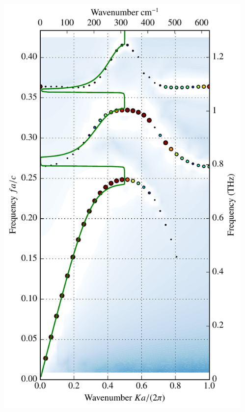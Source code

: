 \documentclass[t]{beamer} \usepackage[english]{babel} \usepackage[utf8]{inputenc} \usetheme{Frankfurt} %
\begin{document}
\begin{frame}[plain]{}
\begin{columns}[T]
\begin{column}{.55\textwidth}
	\end{column}%
	\begin{column}{.45\textwidth}%
		\vspace{-1mm}\includegraphics[height=\paperheight]{../img-cdh-new/CDH_SRRArray_06.pdf} 
	\end{column}
\end{columns}
\end{frame} 		%
\end{document}

